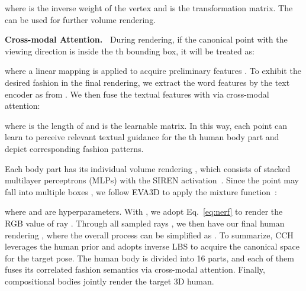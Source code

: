 \documentclass[11pt]{article}
\begin{document}
where  is the inverse weight of the vertex  and  is the transformation matrix. The  can be used for further volume rendering.

\vspace{1ex} \noindent \textbf{Cross-modal Attention.~}
During rendering, if the canonical point  with the viewing direction  is inside the th bounding box, it will be treated as:

where a linear mapping is applied to acquire preliminary features . To exhibit the desired fashion in the final rendering, we extract the word features by the text encoder as  from . We then fuse the textual features with  via cross-modal attention:

where  is the length of  and  is the learnable matrix. In this way, each point can learn to perceive relevant textual guidance for the th human body part and depict corresponding fashion patterns.

Each body part has its individual volume rendering , which consists of stacked multilayer perceptrons (MLPs) with the SIREN activation~\cite{sitzmann2020siren}. Since the point  may fall into multiple boxes , we follow EVA3D to apply the mixture function~\cite{lombardi2021mixture}:

where  and  are hyperparameters. With , we adopt Eq.~\ref{eq:nerf} to render the RGB value of ray . Through all sampled rays , we then have our final human rendering , where the overall process can be simplified as . To summarize, CCH leverages the human prior and adopts inverse LBS to acquire the canonical space for the target pose. The human body is divided into 16 parts, and each of them fuses its correlated fashion semantics via cross-modal attention. Finally, compositional bodies jointly render the target 3D human.
\end{document}
